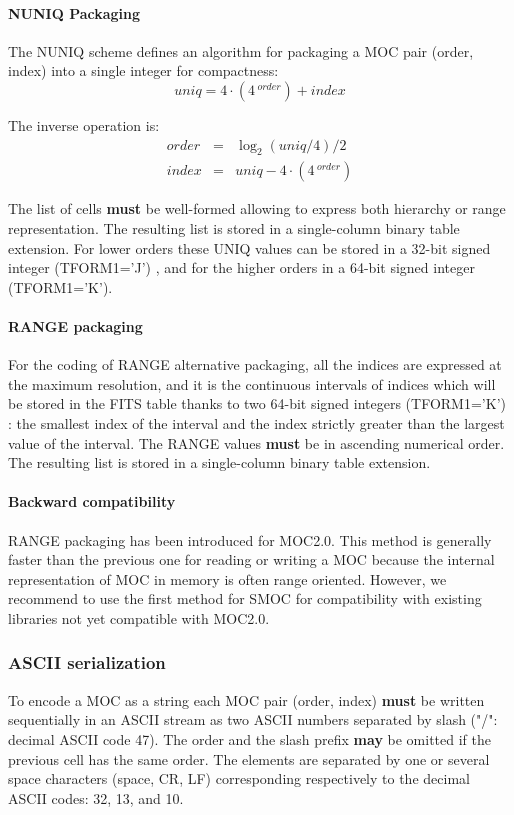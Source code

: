 \documentclass[11pt,a4paper]{ivoa}
\begin{document}
\paragraph{NUNIQ Packaging}
The NUNIQ scheme defines an algorithm for packaging a MOC pair (order,
index) into a single integer for compactness:
$$
    \textit{uniq} = 4 \cdot (4\,^\textit{order}) + \textit{index}
$$

\par\noindent
The inverse operation is:
\begin{eqnarray*}
    \textit{order} & = &\log_2(\textit{uniq}/4)/2\\
    \textit{index} & = &\textit{uniq} - 4 \cdot (4\,^\textit{order})
\end{eqnarray*}

\par\noindent The list of cells {\bf must} be well-formed allowing
to express both hierarchy or range representation. The resulting
list is stored in a single-column binary table extension. For
lower orders these UNIQ values can be stored in a 32-bit signed integer
(TFORM1='J') , and for the higher orders in a 64-bit signed integer
(TFORM1='K').

\paragraph{RANGE packaging}
For the coding of RANGE alternative packaging, all the indices are
expressed at the maximum resolution, and it is the continuous
intervals of indices which will be stored
in the FITS table thanks to two 64-bit signed integers (TFORM1='K') :
the smallest index of the interval and the index strictly greater
than the largest value of the interval. The RANGE values {\bf must}
be in ascending numerical order. The resulting list is stored in a
single-column binary table extension. 


\paragraph{Backward compatibility}
RANGE packaging has been introduced for MOC2.0.
This method is generally faster than the previous one for reading or
writing a MOC because the internal representation of MOC
in memory is often range oriented. However, we recommend to
use the first method for SMOC for compatibility with existing libraries 
not yet compatible with MOC2.0.

\subsubsection{ASCII serialization}
To encode a MOC as a string each MOC pair (order, index) {\bf must} be written
sequentially in an ASCII stream as two ASCII numbers separated
by slash ("/": decimal ASCII code 47). The order and the slash prefix
{\bf may} be omitted if the previous cell has the same order. The
elements are separated by one or several space characters (space, CR,
LF) corresponding respectively to the decimal ASCII codes: 32, 13, and
10.
\end{document}
